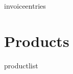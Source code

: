 \documentclass[
	{{language}},
	printaddress,
	quote
]{GEWISLetter}
\begin{document}
	\begin{invoice}{}
		{{invoiceentries}}
	\end{invoice}
	
	\newpage
	\appendix
	\section{Products}%
	\begin{products}
		{{productlist}}
	\end{products}
\end{document}
